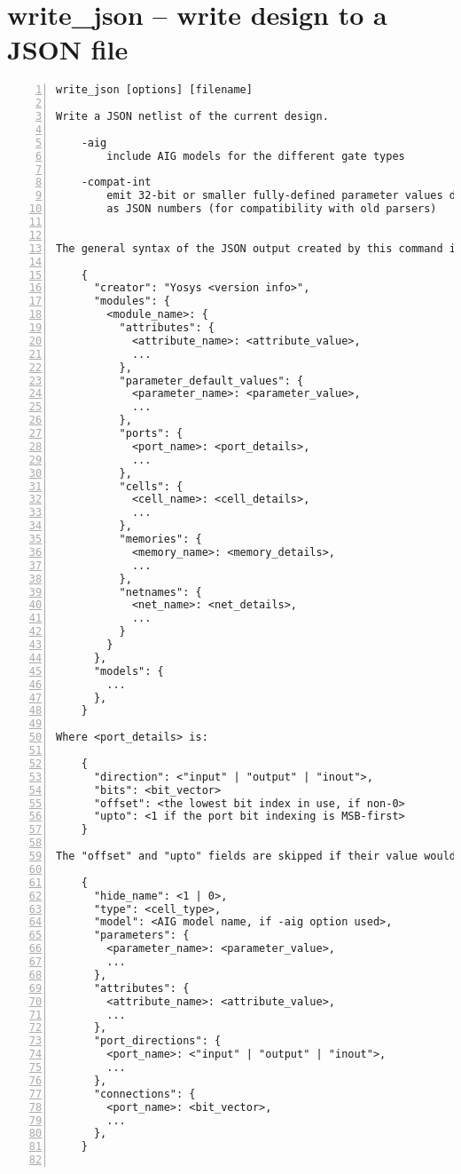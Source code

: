 \section{write\_json -- write design to a JSON file}
\label{cmd:write_json}
\begin{lstlisting}[numbers=left,frame=single]
    write_json [options] [filename]

Write a JSON netlist of the current design.

    -aig
        include AIG models for the different gate types

    -compat-int
        emit 32-bit or smaller fully-defined parameter values directly
        as JSON numbers (for compatibility with old parsers)


The general syntax of the JSON output created by this command is as follows:

    {
      "creator": "Yosys <version info>",
      "modules": {
        <module_name>: {
          "attributes": {
            <attribute_name>: <attribute_value>,
            ...
          },
          "parameter_default_values": {
            <parameter_name>: <parameter_value>,
            ...
          },
          "ports": {
            <port_name>: <port_details>,
            ...
          },
          "cells": {
            <cell_name>: <cell_details>,
            ...
          },
          "memories": {
            <memory_name>: <memory_details>,
            ...
          },
          "netnames": {
            <net_name>: <net_details>,
            ...
          }
        }
      },
      "models": {
        ...
      },
    }

Where <port_details> is:

    {
      "direction": <"input" | "output" | "inout">,
      "bits": <bit_vector>
      "offset": <the lowest bit index in use, if non-0>
      "upto": <1 if the port bit indexing is MSB-first>
    }

The "offset" and "upto" fields are skipped if their value would be 0.They don't affect connection semantics, and are only used to preserve originalHDL bit indexing.And <cell_details> is:

    {
      "hide_name": <1 | 0>,
      "type": <cell_type>,
      "model": <AIG model name, if -aig option used>,
      "parameters": {
        <parameter_name>: <parameter_value>,
        ...
      },
      "attributes": {
        <attribute_name>: <attribute_value>,
        ...
      },
      "port_directions": {
        <port_name>: <"input" | "output" | "inout">,
        ...
      },
      "connections": {
        <port_name>: <bit_vector>,
        ...
      },
    }


\end{lstlisting}

